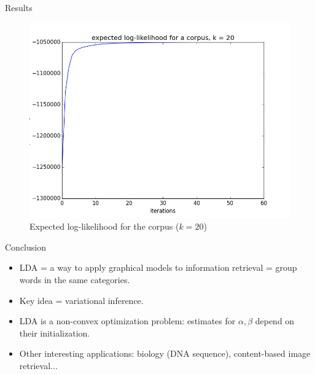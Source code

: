 \documentclass[final]{beamer}
\newlength{\onecolwid}
\begin{document}
\begin{frame}[t]
\begin{columns}[t]
\begin{column}{\onecolwid}
\begin{block}{Results}
\begin{figure}[ht!]
\begin{center}
\includegraphics[width=0.7\linewidth]{../img/k=20/log_likelihood_corpus_k=20.png}
\caption{Expected log-likelihood for the corpus ($k=20$)}
\end{center}
\end{figure}
\end{block}

\begin{block}{Conclusion}
\begin{itemize}
  \item LDA = a way to apply graphical models to information retrieval = group words in the same categories. 
  \item Key idea = variational inference. 
  \item LDA is a non-convex optimization problem: estimates for $\alpha, \beta$ depend on their initialization.
  \item Other interesting applications: biology (DNA sequence), content-based image retrieval$\ldots$
\end{itemize}
\end{block}


\end{column}

\end{columns} %
\end{frame} %
\end{document}
